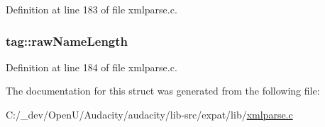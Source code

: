 Definition at line 183 of file xmlparse.\+c.

\subsubsection[{\texorpdfstring{raw\+Name\+Length}{rawNameLength}}]{ tag\+::raw\+Name\+Length}\hypertarget{structtag_a5c5de229e856b5076244c0ff51e77d48}{}\label{structtag_a5c5de229e856b5076244c0ff51e77d48}


Definition at line 184 of file xmlparse.\+c.



The documentation for this struct was generated from the following file\+:\begin{DoxyCompactItemize}
\item 
C\+:/\+\_\+dev/\+Open\+U/\+Audacity/audacity/lib-\/src/expat/lib/\hyperlink{xmlparse_8c}{xmlparse.\+c}\end{DoxyCompactItemize}
